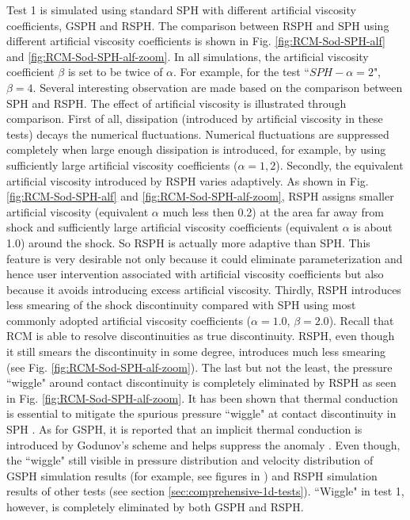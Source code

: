 Test 1 is simulated using standard SPH with different artificial viscosity coefficients, GSPH and RSPH. The comparison between RSPH and SPH using different artificial viscosity coefficients is shown in Fig. \ref{fig:RCM-Sod-SPH-alf} and \ref{fig:RCM-Sod-SPH-alf-zoom}. In all simulations, the artificial viscosity coefficient $\beta$ is set to be twice of $\alpha$. For example, for the test ``$SPH-\alpha=2$", $\beta=4$. Several interesting observation are made based on the comparison between SPH and RSPH. The effect of artificial viscosity is illustrated through comparison.
First of all, dissipation (introduced by artificial viscosity in these tests) decays the numerical fluctuations. Numerical fluctuations are suppressed completely when large enough dissipation is introduced, for example, by using sufficiently large artificial viscosity coefficients ($\alpha=1,2$).
Secondly, the equivalent artificial viscosity introduced by RSPH varies adaptively.
As shown in Fig. \ref{fig:RCM-Sod-SPH-alf} and \ref{fig:RCM-Sod-SPH-alf-zoom}, RSPH assigns smaller artificial viscosity  (equivalent $\alpha$ much less then 0.2) at the area far away from shock and sufficiently large artificial viscosity coefficients (equivalent $\alpha$ is about 1.0) around the shock. So RSPH is actually more adaptive than SPH. This feature is very desirable not only because it could eliminate parameterization and hence user intervention associated with artificial viscosity coefficients but also because it avoids introducing excess artificial viscosity.
Thirdly, RSPH introduces less smearing of the shock discontinuity compared with SPH using most commonly adopted artificial viscosity coefficients ($\alpha=1.0$, $\beta=2.0$). Recall that RCM is able to resolve discontinuities as true discontinuity. RSPH, even though it still smears the discontinuity in some degree, introduces much less smearing (see Fig. \ref{fig:RCM-Sod-SPH-alf-zoom}).
The last but not the least, the pressure ``wiggle" around contact discontinuity is completely eliminated by RSPH as seen in Fig. \ref{fig:RCM-Sod-SPH-alf-zoom}. It has been shown that thermal conduction is essential to mitigate the spurious pressure ``wiggle" at contact discontinuity in SPH \citep{monaghan1997sph, sigalotti2006shock, price2008modelling, price2012smoothed}. As for GSPH, it is reported that an implicit thermal conduction is introduced by Godunov's scheme and helps suppress the anomaly \citep{puri2014approximate}. Even though, the ``wiggle" still visible in pressure distribution and velocity distribution of GSPH simulation results (for example, see figures in \citep{puri2014comparison}) and RSPH simulation results of other tests (see section \ref{sec:comprehensive-1d-tests}). ``Wiggle" in test 1, however, is completely eliminated by both GSPH and RSPH.

